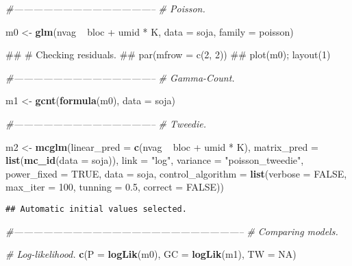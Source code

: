 \documentclass[9pt,a5paper,]{book}
\newenvironment{Shaded}{}{}
\newcommand{\KeywordTok}[1]{\textbf{{#1}}}
\newcommand{\DataTypeTok}[1]{\underline{{#1}}}
\newcommand{\DecValTok}[1]{{#1}}
\newcommand{\FloatTok}[1]{{#1}}
\newcommand{\StringTok}[1]{{#1}}
\newcommand{\CommentTok}[1]{\textit{{#1}}}
\newcommand{\OtherTok}[1]{{#1}}
\newcommand{\NormalTok}[1]{{#1}}
\renewenvironment{Shaded}{\color{inputcolor}}{}
\renewcommand{\DataTypeTok}[1]{{#1}}
\theoremstyle{definition}
\theoremstyle{definition}
\theoremstyle{remark}
\begin{document}
\begin{Shaded}
\begin{Highlighting}[]
\CommentTok{#--------------------------------------------}
\CommentTok{# Poisson.}

\NormalTok{m0 <-}\StringTok{ }\KeywordTok{glm}\NormalTok{(nvag ~}\StringTok{ }\NormalTok{bloc +}\StringTok{ }\NormalTok{umid *}\StringTok{ }\NormalTok{K,}
          \DataTypeTok{data =} \NormalTok{soja,}
          \DataTypeTok{family =} \NormalTok{poisson)}

\NormalTok{## # Checking residuals.}
\NormalTok{## par(mfrow = c(2, 2))}
\NormalTok{## plot(m0); layout(1)}

\CommentTok{#--------------------------------------------}
\CommentTok{# Gamma-Count.}

\NormalTok{m1 <-}\StringTok{ }\KeywordTok{gcnt}\NormalTok{(}\KeywordTok{formula}\NormalTok{(m0), }\DataTypeTok{data =} \NormalTok{soja)}

\CommentTok{#--------------------------------------------}
\CommentTok{# Tweedie.}

\NormalTok{m2 <-}\StringTok{ }\KeywordTok{mcglm}\NormalTok{(}\DataTypeTok{linear_pred =} \KeywordTok{c}\NormalTok{(nvag ~}\StringTok{ }\NormalTok{bloc +}\StringTok{ }\NormalTok{umid *}\StringTok{ }\NormalTok{K),}
            \DataTypeTok{matrix_pred =} \KeywordTok{list}\NormalTok{(}\KeywordTok{mc_id}\NormalTok{(}\DataTypeTok{data =} \NormalTok{soja)),}
            \DataTypeTok{link =} \StringTok{"log"}\NormalTok{,}
            \DataTypeTok{variance =} \StringTok{"poisson_tweedie"}\NormalTok{,}
            \DataTypeTok{power_fixed =} \OtherTok{TRUE}\NormalTok{,}
            \DataTypeTok{data =} \NormalTok{soja,}
            \DataTypeTok{control_algorithm =} \KeywordTok{list}\NormalTok{(}\DataTypeTok{verbose =} \OtherTok{FALSE}\NormalTok{,}
                                     \DataTypeTok{max_iter =} \DecValTok{100}\NormalTok{,}
                                     \DataTypeTok{tunning =} \FloatTok{0.5}\NormalTok{,}
                                     \DataTypeTok{correct =} \OtherTok{FALSE}\NormalTok{))}
\end{Highlighting}
\end{Shaded}

\begin{verbatim}
## Automatic initial values selected.
\end{verbatim}

\begin{Shaded}
\begin{Highlighting}[]
\CommentTok{#-----------------------------------------------------------------------}
\CommentTok{# Comparing models.}

\CommentTok{# Log-likelihood.}
\KeywordTok{c}\NormalTok{(}\DataTypeTok{P =} \KeywordTok{logLik}\NormalTok{(m0), }\DataTypeTok{GC =} \KeywordTok{logLik}\NormalTok{(m1), }\DataTypeTok{TW =} \OtherTok{NA}\NormalTok{)}
\end{Highlighting}
\end{Shaded}
\end{document}

